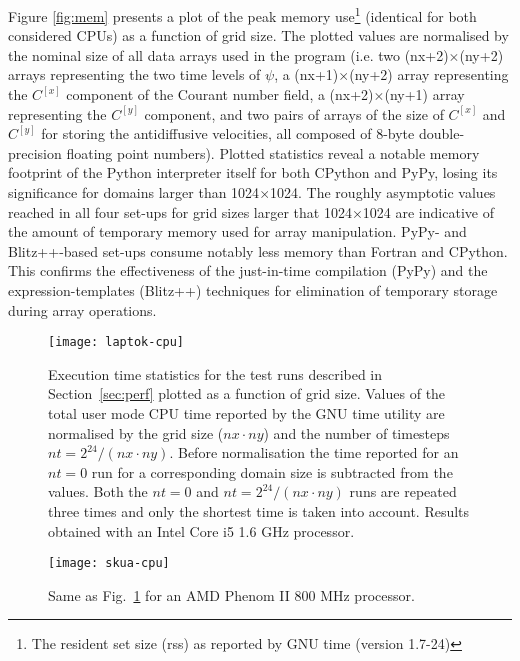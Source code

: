 \documentclass[gmd]{copernicus}%
\begin{document}
  Figure \ref{fig:mem} presents a plot of the peak memory use\footnote{The resident set size (rss)
    as reported by GNU time (version 1.7-24)} (identical for both considered CPUs)
    as a function of grid size.
  The plotted values are normalised by the nominal size of all data arrays used in the program
    (i.e. two (nx+2)$\times$(ny+2) arrays representing the two time levels of $\psi$, 
     a (nx+1)$\times$(ny+2) array representing the $C^{[x]}$ component of the Courant number field,
     a (nx+2)$\times$(ny+1) array representing the $C^{[y]}$ component, 
     and two pairs of arrays of the size of $C^{[x]}$ and $C^{[y]}$ for storing the 
     antidiffusive velocities, all composed of 8-byte double-precision floating point numbers).
  Plotted statistics reveal a notable memory footprint of the Python interpreter itself
    for both CPython and PyPy, losing its significance for domains larger than 1024$\times$1024.
  The roughly asymptotic values reached in all four set-ups for grid sizes larger that 1024$\times$1024
    are indicative of the amount of temporary memory used for array manipulation.
  PyPy- and Blitz++-based set-ups consume notably less memory than Fortran and CPython.
  This confirms the effectiveness of the just-in-time compilation (PyPy) and the expression-templates (Blitz++) techniques
    for elimination of temporary storage during array operations.

  \begin{figure}[t]
    \center
    \texttt{[image: laptok-cpu]}
    \caption{\label{fig:cpu-eyrie}
      Execution time statistics for the test runs described in Section~\ref{sec:perf}
        plotted as a function of grid size.
      Values of the total user mode CPU time reported by the GNU time utility are
        normalised by the grid size ($nx \cdot ny$) and the number of timesteps $nt=2^{24}/(nx \cdot ny)$.
      Before normalisation the time reported for an $nt=0$ run for a corresponding
        domain size is subtracted from the values.
      Both the $nt=0$ and $nt=2^{24}/(nx \cdot ny)$ runs are repeated three times and
        only the shortest time is taken into account.
      Results obtained with an Intel\textsuperscript{\textregistered} 
        Core\textsuperscript{\texttrademark} i5 1.6 GHz processor.
    }
  \end{figure}
  \begin{figure}[t]
    \center
    \texttt{[image: skua-cpu]}
    \caption{\label{fig:cpu-skua}
      Same as Fig.~\ref{fig:cpu-eyrie} for an AMD Phenom\textsuperscript{\texttrademark} II 800 MHz processor.
    }
  \end{figure}
\end{document}
